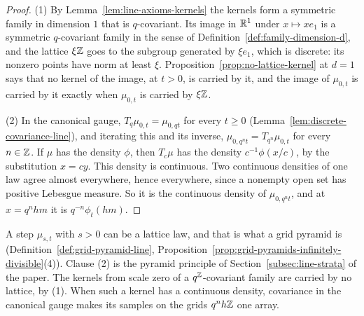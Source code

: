 \begin{proof}
(1) By Lemma~\ref{lem:line-axioms-kernels} the kernels form a symmetric family in dimension $1$
that is $q$-covariant. Its image in $\mathbb{R}^1$ under $x \mapsto xe_1$ is a symmetric $q$-covariant
family in the sense of Definition~\ref{def:family-dimension-d}, and the lattice $\xi\mathbb{Z}$ goes to
the subgroup generated by $\xi e_1$, which is discrete: its nonzero points have norm at least
$\xi$. Proposition~\ref{prop:no-lattice-kernel} at $d = 1$ says that no kernel of the image, at
$t > 0$, is carried by it, and the image of $\mu_{0,t}$ is carried by it exactly when $\mu_{0,t}$ is
carried by $\xi\mathbb{Z}$.

(2) In the canonical gauge, $T_q\mu_{0,t} = \mu_{0,qt}$ for every $t \ge 0$
(Lemma~\ref{lem:discrete-covariance-line}), and iterating this and its inverse,
$\mu_{0,q^nt} = T_{q^n}\mu_{0,t}$ for every $n \in \mathbb{Z}$. If $\mu$ has the density $\phi$, then
$T_c\mu$ has the density $c^{-1}\phi(x/c)$, by the substitution $x = cy$. This density is
continuous. Two continuous densities of one law agree almost everywhere, hence everywhere, since a
nonempty open set has positive Lebesgue measure. So it is the continuous density of
$\mu_{0,q^nt}$, and at $x = q^nhm$ it is $q^{-n}\phi_t(hm)$.
\end{proof}

A step $\mu_{s,t}$ with $s > 0$ can be a lattice law, and that is what a grid pyramid is
(Definition~\ref{def:grid-pyramid-line}, Proposition~\ref{prop:grid-pyramids-infinitely-divisible}(4)).
Clause (2) is the pyramid principle of Section~\ref{subsec:line-strata} of the paper. The kernels
from scale zero of a $q^{\mathbb{Z}}$-covariant family are carried by no lattice, by (1). When such a kernel
has a continuous density, covariance in the canonical gauge makes its samples on the grids
$q^nh\mathbb{Z}$ one array.
